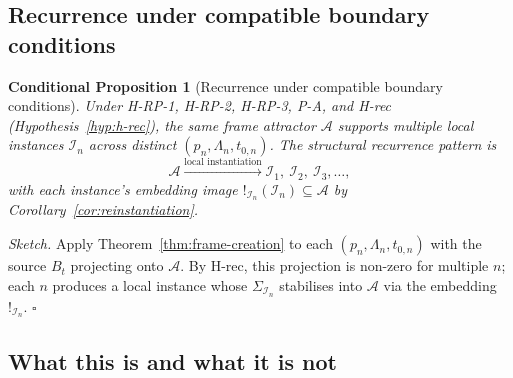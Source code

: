 \documentclass[11pt]{article}
\theoremstyle{plain}
\newtheorem{conditional}[theorem]{Conditional Proposition}
\theoremstyle{definition}
\theoremstyle{remark}
\newcommand{\Ical}{\mathcal{I}}
\begin{document}
\subsection{Recurrence under compatible boundary conditions}

\begin{conditional}[Recurrence under compatible boundary conditions]\label{cthm:frame-recurrence}
Under H-RP-1, H-RP-2, H-RP-3, P-A, and H-rec (Hypothesis~\ref{hyp:h-rec}), the same frame attractor $\mathcal{A}$ supports multiple local instances $\Ical_n$ across distinct $(p_n, \Lambda_n, t_{0,n})$. The structural recurrence pattern is
\[
  \mathcal{A} \xrightarrow{\text{local instantiation}} \Ical_1,\ \Ical_2,\ \Ical_3, \ldots,
\]
with each instance's embedding image $!_{\Ical_n}(\Ical_n) \subseteq \mathcal{A}$ by Corollary~\ref{cor:reinstantiation}.
\end{conditional}

\noindent\emph{Sketch.} Apply Theorem~\ref{thm:frame-creation} to each $(p_n, \Lambda_n, t_{0,n})$ with the source $B_t$ projecting onto $\mathcal{A}$. By H-rec, this projection is non-zero for multiple $n$; each $n$ produces a local instance whose $\Sigma_{\Ical_n}$ stabilises into $\mathcal{A}$ via the embedding $!_{\Ical_n}$. \hfill$\square$

\subsection{What this is and what it is not}
\end{document}
